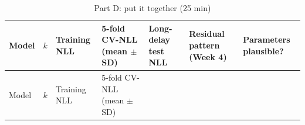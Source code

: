\begin{landscape}\small
\begin{longtable}[]{@{}
  >{\raggedright\arraybackslash}p{}
  >{\raggedright\arraybackslash}p{}
  >{\raggedright\arraybackslash}p{}
  >{\raggedright\arraybackslash}p{}
  >{\raggedright\arraybackslash}p{}
  >{\raggedright\arraybackslash}p{}
  >{\raggedright\arraybackslash}p{}@{}}
\caption{\centering Part D: put it together (25 min)}\tabularnewline
\toprule\noalign{}
\begin{minipage}[b]{\linewidth}\raggedright
Model
\end{minipage} & \begin{minipage}[b]{\linewidth}\raggedright
\(k\)
\end{minipage} & \begin{minipage}[b]{\linewidth}\raggedright
Training NLL
\end{minipage} & \begin{minipage}[b]{\linewidth}\raggedright
5-fold CV-NLL (mean \ensuremath{\pm} SD)
\end{minipage} & \begin{minipage}[b]{\linewidth}\raggedright
Long-delay test NLL
\end{minipage} & \begin{minipage}[b]{\linewidth}\raggedright
Residual pattern (Week 4)
\end{minipage} & \begin{minipage}[b]{\linewidth}\raggedright
Parameters plausible?
\end{minipage} \\
\midrule\noalign{}
\endfirsthead
\toprule\noalign{}
\begin{minipage}[b]{\linewidth}\raggedright
Model
\end{minipage} & \begin{minipage}[b]{\linewidth}\raggedright
\(k\)
\end{minipage} & \begin{minipage}[b]{\linewidth}\raggedright
Training NLL
\end{minipage} & \begin{minipage}[b]{\linewidth}\raggedright
5-fold CV-NLL (mean \ensuremath{\pm} SD)
\end{minipage} & \begin{minipage}[b]{\linewidth}\raggedright

\end{minipage}
\end{longtable}
\end{landscape}
